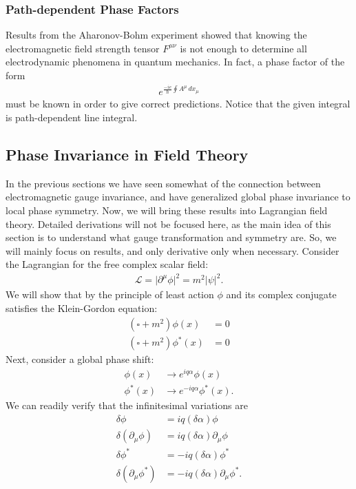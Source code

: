 \documentclass[a4paper,11pt]{article}
\numberwithin{equation}{section}
\theoremstyle{definition}
\newcommand{\p}{\partial}
\newcommand{\lag}{\mathcal{L}}
\begin{document}
\subsubsection{Path-dependent Phase Factors}
Results from the Aharonov-Bohm experiment showed that knowing the electromagnetic field strength tensor $F^{\mu\nu}$ is not enough to determine all electrodynamic phenomena in quantum mechanics. In fact, a phase factor of the form
\begin{align}
e^{\frac{-ie}{\hbar}\oint A^\mu\,dx_\mu}
\end{align}
must be known in order to give correct predictions. Notice that the given integral is path-dependent line integral. 

\subsection{Phase Invariance in Field Theory}
In the previous sections we have seen somewhat of the connection between electromagnetic gauge invariance, and have generalized global phase invariance to local phase symmetry. Now, we will bring these results into Lagrangian field theory. Detailed derivations will not be focused here, as the main idea of this section is to understand what gauge transformation and symmetry are. So, we will mainly focus on results, and only derivative only when necessary. Consider the Lagrangian for the free complex scalar field: 
\begin{align}
\lag = \vert \p^\mu \phi \vert^2 = m^2\vert \psi \vert^2.
\end{align}
We will show that by the principle of least action $\phi$ and its complex conjugate satisfies the Klein-Gordon equation:
\begin{align}
(\square + m^2)\phi(x) &= 0\\
(\square + m^2)\phi^*(x) &= 0
\end{align}
Next, consider a global phase shift:
\begin{align}
\phi(x)&\to e^{iq\alpha}\phi(x)\\
\phi^*(x) &\to e^{-iq\alpha}\phi^*(x).
\end{align}
We can readily verify that the infinitesimal variations are
\begin{align}
\delta \phi &= iq(\delta \alpha)\phi\\
\delta(\p_\mu\phi) &= iq(\delta \alpha)\p_\mu\phi\\
\delta \phi^* &= -iq(\delta \alpha)\phi^*\\
\delta(\p_\mu\phi^*) &= -iq(\delta \alpha)\p_\mu\phi^*.
\end{align}
\end{document}
